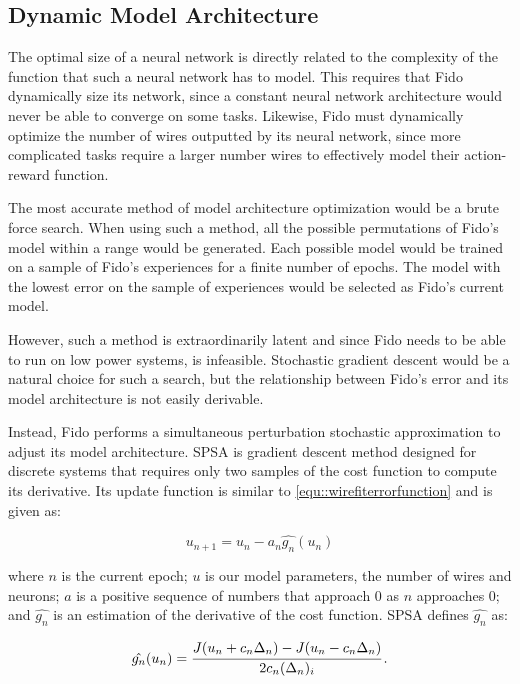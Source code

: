 \subsection{Dynamic Model Architecture}

The optimal size of a neural network is directly related to the complexity of the function that such a neural network has to model. This requires that Fido dynamically size its network, since a constant neural network architecture would never be able to converge on some tasks. Likewise, Fido must dynamically optimize the number of wires outputted by its neural network, since more complicated tasks require a larger number wires to effectively model their action-reward function.

The most accurate method of model architecture optimization would be a brute force search. When using such a method, all the possible permutations of Fido's model within a range would be generated. Each possible model would be trained on a sample of Fido's experiences for a finite number of epochs. The model with the lowest error on the sample of experiences would be selected as Fido's current model.

However, such a method is extraordinarily latent and since Fido needs to be able to run on low power systems, is infeasible. Stochastic gradient descent would be a natural choice for such a search, but the relationship between Fido's error and its model architecture is not easily derivable.

Instead, Fido performs a simultaneous perturbation stochastic approximation \cite{spall} to adjust its model architecture. SPSA is gradient descent method designed for discrete systems that requires only two samples of the cost function to compute its derivative. Its update function is similar to \ref{equ::wirefiterrorfunction} and is given as:

\begin{equation}
	u_{n+1} = u_n - a_n\hat{g_n}(u_n)
	\label{equ::spsaupdate}
\end{equation}

\noindent

where $n$ is the current epoch; $u$ is our model parameters, the number of wires and neurons; $a$ is a positive sequence of numbers that approach 0 as $n$ approaches 0; and $\hat{g_n}$ is an estimation of the derivative of the cost function. SPSA defines $\hat{g_n}$ as:

\begin{equation}
	\hat{g_n}(u_n) = \cfrac{J(u_n + c_n\Delta_n)-J(u_n - c_n\Delta_n)}{2c_n(\Delta_n)_i}
	\,.
	\label{equ::spsaderivative}
\end{equation}

